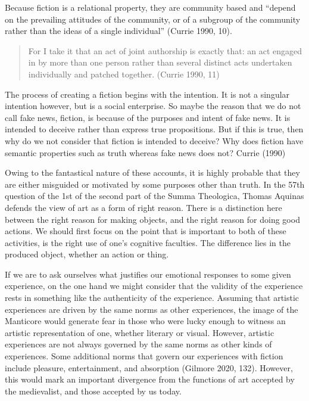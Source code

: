 \documentclass[
  letterpaper,
  DIV=11,
  numbers=noendperiod]{scrreprt}
\begin{document}
\begin{tcolorbox}[enhanced jigsaw, arc=.35mm, breakable, rightrule=.15mm, colback=white, colframe=quarto-callout-important-color-frame, bottomrule=.15mm, leftrule=.75mm, opacityback=0, toprule=.15mm, left=2mm]
\begin{tcolorbox}[enhanced jigsaw, arc=.35mm, breakable, rightrule=.15mm, colback=white, colframe=quarto-callout-tip-color-frame, bottomrule=.15mm, leftrule=.75mm, opacityback=0, toprule=.15mm, left=2mm]
Because fiction is a relational property, they are community based and
``depend on the prevailing attitudes of the community, or of a subgroup
of the community rather than the ideas of a single individual'' (Currie
1990, 10).

\begin{quote}
For I take it that an act of joint authorship is exactly that: an act
engaged in by more than one person rather than several distinct acts
undertaken individually and patched together. (Currie 1990, 11)
\end{quote}

The process of creating a fiction begins with the intention. It is not a
singular intention however, but is a social enterprise. So maybe the
reason that we do not call fake news, fiction, is because of the
purposes and intent of fake news. It is intended to deceive rather than
express true propositions. But if this is true, then why do we not
consider that fiction is intended to deceive? Why does fiction have
semantic properties such as truth whereas fake news does not? Currie
(1990)

Owing to the fantastical nature of these accounts, it is highly probable
that they are either misguided or motivated by some purposes other than
truth. In the 57th question of the 1st of the second part of the Summa
Theologica, Thomas Aquinas defends the view of art as a form of right
reason. There is a distinction here between the right reason for making
objects, and the right reason for doing good actions. We should first
focus on the point that is important to both of these activities, is the
right use of one's cognitive faculties. The difference lies in the
produced object, whether an action or thing.

If we are to ask ourselves what justifies our emotional responses to
some given experience, on the one hand we might consider that the
validity of the experience rests in something like the authenticity of
the experience. Assuming that artistic experiences are driven by the
same norms as other experiences, the image of the Manticore would
generate fear in those who were lucky enough to witness an artistic
representation of one, whether literary or visual. However, artistic
experiences are not always governed by the same norms as other kinds of
experiences. Some additional norms that govern our experiences with
fiction include pleasure, entertainment, and absorption (Gilmore 2020,
132). However, this would mark an important divergence from the
functions of art accepted by the medievalist, and those accepted by us
today.


\end{tcolorbox}
\end{tcolorbox}
\end{document}
